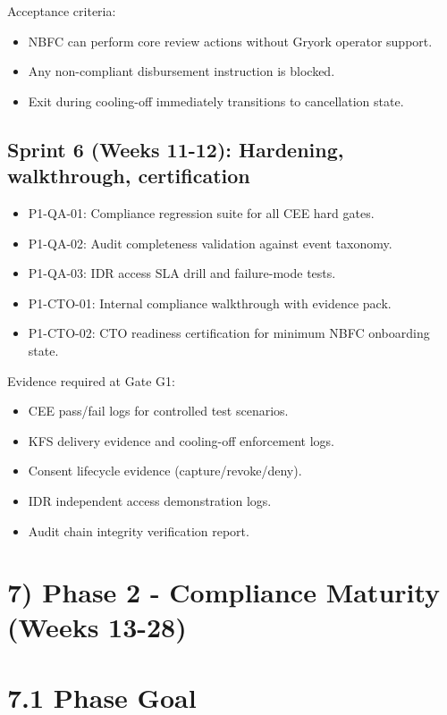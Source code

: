 ﻿\documentclass[12pt]{article}
\begin{document}
Acceptance criteria:

\begin{itemize}
\item NBFC can perform core review actions without Gryork operator support.
\item Any non-compliant disbursement instruction is blocked.
\item Exit during cooling-off immediately transitions to cancellation state.
\end{itemize}

\subsection{Sprint 6 (Weeks 11-12): Hardening, walkthrough, certification}


\begin{itemize}
\item P1-QA-01: Compliance regression suite for all CEE hard gates.
\item P1-QA-02: Audit completeness validation against event taxonomy.
\item P1-QA-03: IDR access SLA drill and failure-mode tests.
\item P1-CTO-01: Internal compliance walkthrough with evidence pack.
\item P1-CTO-02: CTO readiness certification for minimum NBFC onboarding state.
\end{itemize}

Evidence required at Gate G1:

\begin{itemize}
\item CEE pass/fail logs for controlled test scenarios.
\item KFS delivery evidence and cooling-off enforcement logs.
\item Consent lifecycle evidence (capture/revoke/deny).
\item IDR independent access demonstration logs.
\item Audit chain integrity verification report.
\end{itemize}

\section{7) Phase 2 - Compliance Maturity (Weeks 13-28)}


\section{7.1 Phase Goal}
\end{document}
